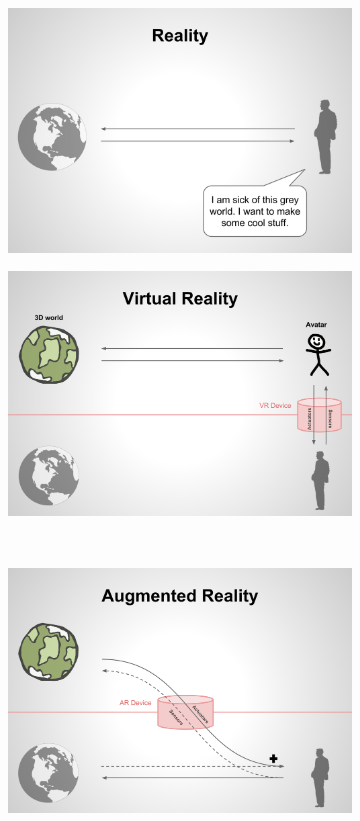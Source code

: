\begin{figure}[h!]
\centering
\begin{subfigure}{0.49\textwidth}
\centering
\includegraphics[scale=0.13]{schemas/reality1}
\end{subfigure}
\begin{subfigure}{0.49\textwidth}
\centering
\includegraphics[scale=0.13]{schemas/virtualreality}
\end{subfigure} \\[1em]
\begin{subfigure}{0.49\textwidth}
\centering
\includegraphics[scale=0.13]{schemas/augmentedreality}

\end{subfigure}
\end{figure}
